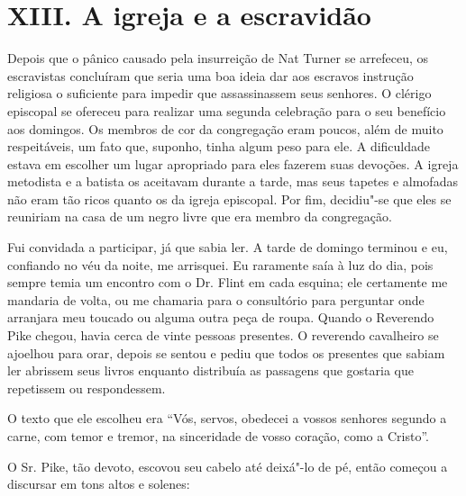 \chapter{XIII. A igreja e a
escravidão}

Depois que o pânico causado pela
insurreição de Nat Turner se arrefeceu, os escravistas concluíram que
seria uma boa ideia dar aos escravos instrução religiosa o suficiente
para impedir que assassinassem seus senhores. O clérigo episcopal se
ofereceu para realizar uma segunda celebração para o seu benefício aos
domingos. Os membros de cor da congregação eram poucos, além de muito
respeitáveis, um fato que, suponho, tinha algum peso para ele. A
dificuldade estava em escolher um lugar apropriado para eles fazerem
suas devoções. A igreja metodista e a batista os aceitavam durante a
tarde, mas seus tapetes e almofadas não eram tão ricos quanto os da
igreja episcopal. Por fim, decidiu"-se que eles se reuniriam na casa de
um negro livre que era membro da congregação.

Fui convidada a participar, já que
sabia ler. A tarde de domingo terminou e eu, confiando no véu da noite,
me arrisquei. Eu raramente saía à luz do dia, pois sempre temia um
encontro com o Dr. Flint em cada esquina; ele certamente me mandaria de
volta, ou me chamaria para o consultório para perguntar onde arranjara
meu toucado ou alguma outra peça de roupa. Quando o Reverendo Pike
chegou, havia cerca de vinte pessoas presentes. O reverendo cavalheiro
se ajoelhou para orar, depois se sentou e pediu que todos os presentes
que sabiam ler abrissem seus livros enquanto distribuía as passagens que
gostaria que repetissem ou respondessem.

O texto que ele escolheu era ``Vós,
servos, obedecei a vossos senhores segundo a carne, com temor e tremor,
na sinceridade de vosso coração, como a Cristo''.

O Sr. Pike, tão devoto, escovou seu
cabelo até deixá"-lo de pé, então começou a discursar em tons altos e
solenes:


